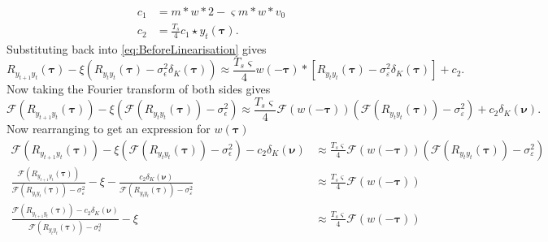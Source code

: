 \documentclass[]{article}
\begin{document}
\begin{align}
	c_1 &= m\ast w\ast 2 - \varsigma m\ast w\ast v_0 \\
	c_2 &= \frac{T_s}{4}c_1 \star y_t(\boldsymbol\tau).
\end{align}
Substituting back into \ref{eq:BeforeLinearisation} gives
\begin{equation}
	R_{y_{t+1}y_t}(\boldsymbol{\tau}) -\xi \left(R_{y_ty_t}(\boldsymbol{\tau})-\sigma_{\epsilon}^2  \delta_{K}\left(\boldsymbol\tau\right)\right) \approx \frac{T_s\varsigma}{4} w(-\boldsymbol\tau) \ast \left[R_{y_ty_t}(\boldsymbol\tau) - \sigma_{\varepsilon}^2 \delta_K(\boldsymbol\tau) \right] + c_2.
\end{equation}
Now taking the Fourier transform of both sides gives
\begin{equation}
	\mathcal{F}(R_{y_{t+1}y_t}(\boldsymbol{\tau})) - \xi \left( \mathcal{F}\left(R_{y_ty_t}(\boldsymbol{\tau}) \right) - \sigma_{\epsilon}^2  \right) \approx \frac{T_s\varsigma}{4}\mathcal{F}(w(-\boldsymbol\tau)) (\mathcal{F}(R_{y_ty_t}(\boldsymbol\tau)) - \sigma_{\varepsilon}^2) + c_2\delta_K(\boldsymbol\nu).
\end{equation}
Now rearranging to get an expression for $w(\boldsymbol\tau)$
\begin{align}
	\mathcal{F}(R_{y_{t+1}y_t}(\boldsymbol{\tau})) - \xi \left( \mathcal{F}\left(R_{y_ty_t}(\boldsymbol{\tau}) \right) - \sigma_{\epsilon}^2  \right) - c_2\delta_K(\boldsymbol\nu) &\approx \frac{T_s\varsigma}{4}\mathcal{F}(w(-\boldsymbol\tau)) (\mathcal{F}(R_{y_ty_t}(\boldsymbol\tau)) - \sigma_{\varepsilon}^2) \\
	\frac{\mathcal{F}(R_{y_{t+1}y_t}(\boldsymbol{\tau}))}{\mathcal{F}(R_{y_ty_t}(\boldsymbol\tau)) - \sigma_{\varepsilon}^2} - \xi - \frac{c_2\delta_K(\boldsymbol\nu)}{\mathcal{F}(R_{y_ty_t}(\boldsymbol\tau)) - \sigma_{\varepsilon}^2} &\approx \frac{T_s\varsigma}{4}\mathcal{F}(w(-\boldsymbol\tau)) \\ 
	\frac{\mathcal{F}(R_{y_{t+1}y_t}(\boldsymbol{\tau})) -c_2\delta_K(\boldsymbol\nu) }{\mathcal{F}(R_{y_ty_t}(\boldsymbol\tau)) - \sigma_{\varepsilon}^2} - \xi &\approx \frac{T_s\varsigma}{4}\mathcal{F}(w(-\boldsymbol\tau))
\end{align}

\newpage
\end{document}
